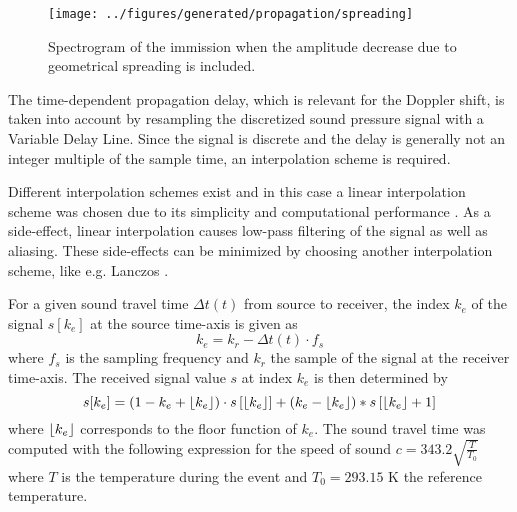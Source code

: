 \begin{figure}[H]
  \centering
  \texttt{[image: ../figures/generated/propagation/spreading]}
  \caption{Spectrogram of the immission when the amplitude decrease due to geometrical spreading is included.}
  \label{fig:implementation:propagation:spreading}
\end{figure}

The time-dependent propagation delay, which is relevant for the Doppler shift,
is taken into account by resampling the discretized sound pressure signal with a
Variable Delay Line. Since the signal is discrete and the delay is generally not
an integer multiple of the sample time, an interpolation scheme is required.

Different interpolation schemes exist and in this case a linear interpolation
scheme was chosen due to its simplicity and computational performance \cite{Heutschi2014}.
As a side-effect, linear interpolation causes low-pass filtering of the signal as
well as aliasing. These side-effects can be minimized by choosing another
interpolation scheme, like e.g. Lanczos \cite{Rietdijk2015, Pieren2015}.


For a given sound travel time $\Delta t(t)$ from source to receiver, the index
$k_{e}$ of the signal $s[k_e]$ at the source time-axis is given as
\begin{equation}
 k_{e} = k_r - \Delta t (t) \cdot f_s
\end{equation}
where $f_s$ is the sampling frequency and $k_r$ the sample of the signal at the receiver time-axis. The received signal value $s$ at index $k_e$ is then determined by
\begin{equation}
 s[k_e] = \left( 1 - k_e +  \lfloor k_e\rfloor \right) \cdot s \left[ \lfloor k_e\rfloor \right] + \left( k_e - \lfloor k_e\rfloor \right) * s \left[ \lfloor k_e\rfloor + 1 \right]
\end{equation}
where $\lfloor k_e\rfloor$ corresponds to the floor function of $k_e$.
The sound travel time was computed with the following expression for the speed of sound $c = 343.2 \sqrt{ \frac{T}{T_0} }$
where $T$ is the temperature during the event and $T_0 = 293.15$ K the reference temperature.

